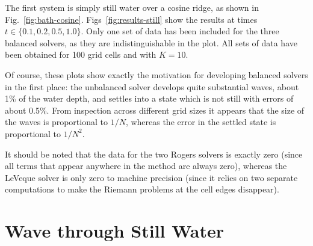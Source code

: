 The first system is simply still water over a cosine ridge, as shown in Fig.~\ref{fig:bath-cosine}. Figs~\ref{fig:results-still} show the results at times $t \in \{0.1, 0.2, 0.5, 1.0\}$. Only one set of data has been included for the three balanced solvers, as they are indistinguishable in the plot. All sets of data have been obtained for 100 grid cells and with $K = 10$.

Of course, these plots show exactly the motivation for developing balanced solvers in the first place: the unbalanced solver develops quite substantial waves, about 1\% of the water depth, and settles into a state which is not still with errors of about 0.5\%. From inspection across different grid sizes it appears that the size of the waves is proportional to $1/N$, whereas the error in the settled state is proportional to $1/N^2$.

It should be noted that the data for the two Rogers solvers is exactly zero (since all terms that appear anywhere in the method are always zero), whereas the LeVeque solver is only zero to machine precision (since it relies on two separate computations to make the Riemann problems at the cell edges disappear).

\section{Wave through Still Water}

